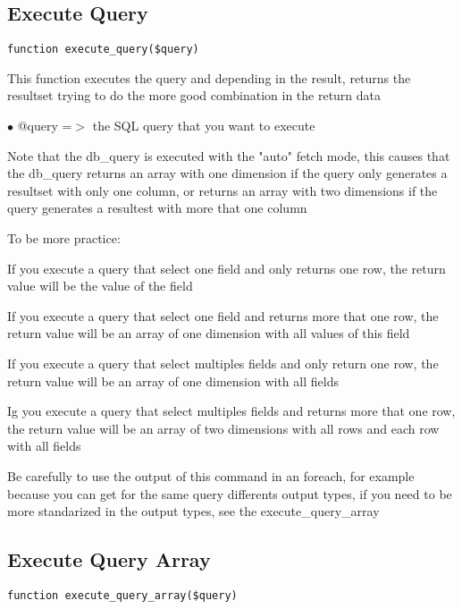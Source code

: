 \documentclass[a4paper]{book}
\begin{document}
\hypertarget{toc248}{}
\subsection{Execute Query}

\begin{lstlisting}
function execute_query($query)
\end{lstlisting}

This function executes the query and depending in the result, returns the
resultset trying to do the more good combination in the return data

\begin{compactitem}
\item[\color{myblue}$\bullet$] @query =$>$ the SQL query that you want to execute
\end{compactitem}

Note that the db\_query is executed with the "auto" fetch mode, this causes
that the db\_query returns an array with one dimension if the query only
generates a resultset with only one column, or returns an array with two
dimensions if the query generates a resultest with more that one column

To be more practice:

If you execute a query that select one field and only returns one row,
the return value will be the value of the field

If you execute a query that select one field and returns more that one
row, the return value will be an array of one dimension with all values
of this field

If you execute a query that select multiples fields and only return one
row, the return value will be an array of one dimension with all fields

Ig you execute a query that select multiples fields and returns more that
one row, the return value will be an array of two dimensions with all rows
and each row with all fields

Be carefully to use the output of this command in an foreach, for example
because you can get for the same query differents output types, if you
need to be more standarized in the output types, see the execute\_query\_array

\hypertarget{toc249}{}
\subsection{Execute Query Array}

\begin{lstlisting}
function execute_query_array($query)
\end{lstlisting}
\end{document}
